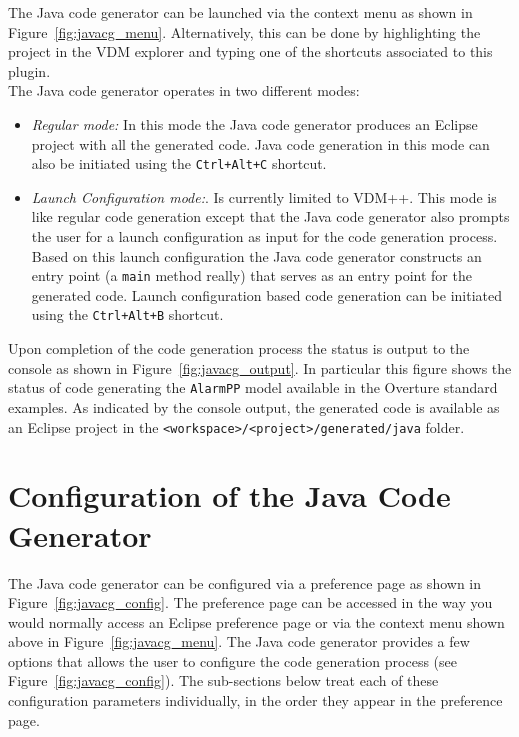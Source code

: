 The Java code generator can be launched via the context menu as shown
in Figure~\ref{fig:javacg_menu}. Alternatively, this can be done by
highlighting the project in the VDM explorer and typing one of the
shortcuts associated to this plugin.\\

\noindent The Java code generator operates in two different modes:

\begin{itemize}

\item \emph{Regular mode:} In this mode the Java code generator
  produces an Eclipse project with all the generated code. Java code
  generation in this mode can also be initiated using the
  \texttt{Ctrl+Alt+C} shortcut.

\item \emph{Launch Configuration mode:}. Is currently limited to
  VDM++. This mode is like regular code generation except that the
  Java code generator also prompts the user for a launch configuration
  as input for the code generation process. Based on this launch
  configuration the Java code generator constructs an entry point (a
  \texttt{main} method really) that serves as an entry point for the
  generated code. Launch configuration based code generation can be
  initiated using the \texttt{Ctrl+Alt+B} shortcut.

\end{itemize}

\noindent Upon completion of the code generation process the status is
output to the console as shown in Figure~\ref{fig:javacg_output}. In
particular this figure shows the status of code generating the
\texttt{AlarmPP} model available in the Overture standard examples. As
indicated by the console output, the generated code is available as an
Eclipse project in the \texttt{<workspace>/<project>/generated/java}
folder.

\section{Configuration of the Java Code Generator}

The Java code generator can be configured via a preference page as
shown in Figure~\ref{fig:javacg_config}. The preference page can be
accessed in the way you would normally access an Eclipse preference
page or via the context menu shown above in
Figure~\ref{fig:javacg_menu}. The Java code generator provides a few
options that allows the user to configure the code generation process
(see Figure~\ref{fig:javacg_config}). The sub-sections below treat
each of these configuration parameters individually, in the order they
appear in the preference page.

